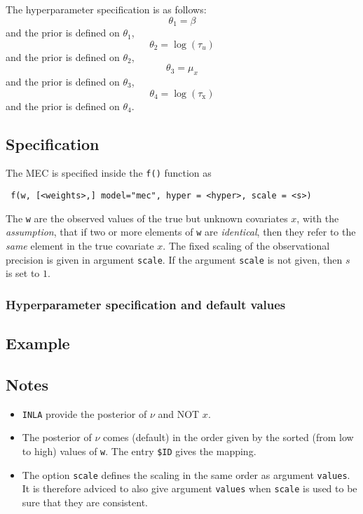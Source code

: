 \documentclass[a4paper,11pt]{article}
\begin{document}
The hyperparameter specification is as follows:
\begin{displaymath}
    \theta_{1} = \beta
\end{displaymath}
and the prior is defined on $\theta_{1}$,
\begin{displaymath}
    \theta_{2} = \log(\tau_u)
\end{displaymath}
and the prior is defined on $\theta_{2}$,
\begin{displaymath}
    \theta_{3} = \mu_{x}
\end{displaymath}
and the prior is defined on $\theta_{3}$,
\begin{displaymath}
    \theta_{4} = \log(\tau_{\text{x}})
\end{displaymath}
and the prior is defined on $\theta_{4}$.


\subsection*{Specification}

The MEC is specified inside the {\tt f()}
function as
\begin{verbatim}
 f(w, [<weights>,] model="mec", hyper = <hyper>, scale = <s>)
\end{verbatim}

The \texttt{w} are the observed values of the true but unknown covariates
$x$, with the \emph{assumption}, that if two or more elements of
\texttt{w} are \emph{identical}, then they refer to the
\emph{same} element in the true covariate $x$. The fixed scaling of
the observational precision is given in argument \texttt{scale}. If
the argument \texttt{scale} is not given, then $s$ is set to $1$.


\subsubsection*{Hyperparameter specification and default values}


\subsection*{Example}



\subsection*{Notes}

\begin{itemize}
\item \texttt{INLA} provide the posterior of $\nu$ and NOT $x$.
\item The posterior of $\nu$ comes (default) in the order given by the sorted
    (from low to high) values of \texttt{w}. The entry \verb|$ID|
    gives the mapping.
\item The option \verb|scale| defines the scaling in the same order as
    argument \verb|values|.  It is therefore adviced to also give
    argument \verb|values| when \verb|scale| is used to be sure that
    they are consistent.
\end{itemize}
\end{document}

